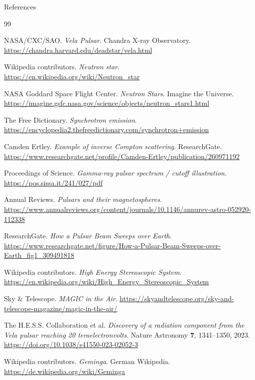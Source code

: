 \documentclass[aspectratio=1610,9pt]{beamer}
\begin{document}
\begin{frame}[allowframebreaks]{References}
  \scriptsize

  \begin{thebibliography}{99}

    NASA/CXC/SAO.
    \newblock \emph{Vela Pulsar}.
    \newblock Chandra X-ray Observatory.
    \newblock \url{https://chandra.harvard.edu/deadstar/vela.html}

    Wikipedia contributors.
    \newblock \emph{Neutron star}.
    \newblock \url{https://en.wikipedia.org/wiki/Neutron_star}

    NASA Goddard Space Flight Center.
    \newblock \emph{Neutron Stars}.
    \newblock Imagine the Universe.
    \newblock \url{https://imagine.gsfc.nasa.gov/science/objects/neutron_stars1.html}

    The Free Dictionary.
    \newblock \emph{Synchrotron emission}.
    \newblock \url{https://encyclopedia2.thefreedictionary.com/synchrotron+emission}

    Camden Ertley.
    \newblock \emph{Example of inverse Compton scattering}.
    \newblock ResearchGate.
    \newblock \url{https://www.researchgate.net/profile/Camden-Ertley/publication/260971192}

    Proceedings of Science.
    \newblock \emph{Gamma-ray pulsar spectrum / cutoff illustration}.
    \newblock \url{https://pos.sissa.it/241/027/pdf}

    Annual Reviews.
    \newblock \emph{Pulsars and their magnetospheres}.
    \newblock \url{https://www.annualreviews.org/content/journals/10.1146/annurev-astro-052920-112338}

    ResearchGate.
    \newblock \emph{How a Pulsar Beam Sweeps over Earth}.
    \newblock \url{https://www.researchgate.net/figure/How-a-Pulsar-Beam-Sweeps-over-Earth_fig1_309491818}

    Wikipedia contributors.
    \newblock \emph{High Energy Stereoscopic System}.
    \newblock \url{https://en.wikipedia.org/wiki/High_Energy_Stereoscopic_System}

    Sky \& Telescope.
    \newblock \emph{MAGIC in the Air}.
    \newblock \url{https://skyandtelescope.org/sky-and-telescope-magazine/magic-in-the-air/}

    The H.E.S.S. Collaboration et al.
    \newblock \emph{Discovery of a radiation component from the Vela pulsar reaching 20 teraelectronvolts}.
    \newblock Nature Astronomy \textbf{7}, 1341--1350, 2023.
    \newblock \url{https://doi.org/10.1038/s41550-023-02052-3}

    Wikipedia contributors.
    \newblock \emph{Geminga}.
    \newblock German Wikipedia.
    \newblock \url{https://de.wikipedia.org/wiki/Geminga}

  \end{thebibliography}
\end{frame}
\end{document}

